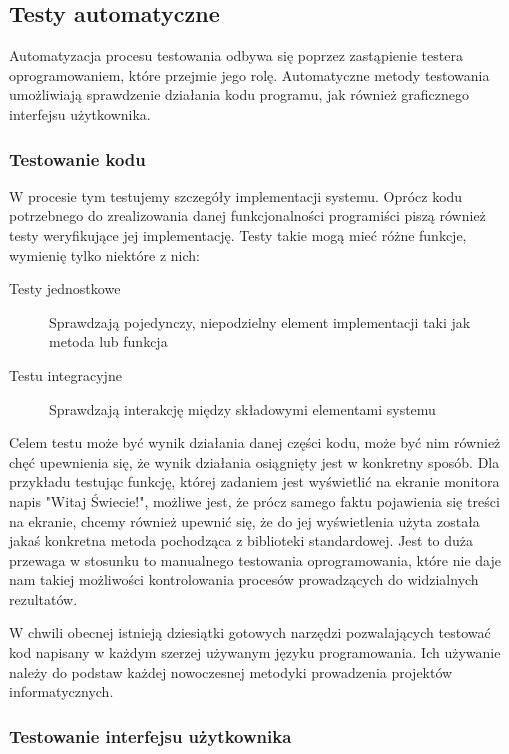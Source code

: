 	  \subsection{Testy automatyczne}
	    Automatyzacja procesu testowania odbywa się poprzez zastąpienie testera oprogramowaniem, które przejmie jego rolę. Automatyczne metody testowania umożliwiają sprawdzenie działania kodu programu, jak również graficznego interfejsu użytkownika.
	    \subsubsection{Testowanie kodu}
	    
	      W procesie tym testujemy szczegóły implementacji systemu. Oprócz kodu potrzebnego do zrealizowania danej funkcjonalności programiści piszą również testy weryfikujące jej implementację. Testy takie mogą mieć różne funkcje, wymienię tylko niektóre z nich:
	      
	      \begin{description}
	        \item[Testy jednostkowe] Sprawdzają pojedynczy, niepodzielny element implementacji taki jak metoda lub funkcja
	        \item[Testu integracyjne] Sprawdzają interakcję między składowymi elementami systemu
        \end{description}
        
        Celem testu może być wynik działania danej części kodu, może być nim również chęć upewnienia się, że wynik działania osiągnięty jest w konkretny sposób. Dla przykładu testując funkcję, której zadaniem jest wyświetlić na ekranie monitora napis "Witaj Świecie!", możliwe jest, że prócz samego faktu pojawienia się treści na ekranie, chcemy również upewnić się, że do jej wyświetlenia użyta została jakaś konkretna metoda pochodząca z biblioteki standardowej. Jest to duża przewaga w stosunku to manualnego testowania oprogramowania, które nie daje nam takiej możliwości kontrolowania procesów prowadzących do widzialnych rezultatów.

        W chwili obecnej istnieją dziesiątki gotowych narzędzi pozwalających testować kod napisany w każdym szerzej używanym języku programowania. Ich używanie należy do podstaw każdej nowoczesnej metodyki prowadzenia projektów informatycznych.
        
      \subsubsection{Testowanie interfejsu użytkownika}
        
